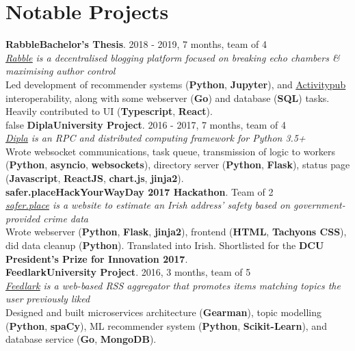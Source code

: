 \documentclass[a4paper, oneside, final]{scrartcl}
\newcommand{\nasc}[2]{\href{#1}{\color{blue}\setulcolor{blue}\ul{#2}}}
\newcommand{\bearna}[0]{\vspace{2.25mm}\\}
\newcommand{\fmtjobtitle}[1]{\textbf{#1}}
\newcommand{\fmtblurb}[1]{\textit{#1}}
\newcommand{\fmtskill}[1]{\textbf{#1}}
\begin{document}
\section{Notable Projects}
\fmtjobtitle{Rabble\hfill Bachelor's Thesis}. 2018 - 2019, 7 months, team of 4\\
\fmtblurb{\nasc{https://github.com/cpssd/rabble}{Rabble} is a decentralised blogging platform focused on breaking echo chambers \& maximising author control}\\
Led development of recommender systems (\fmtskill{Python}, \fmtskill{Jupyter}), and \nasc{http://activitypub.rocks}{Activitypub} interoperability, along with some webserver (\fmtskill{Go}) and database (\fmtskill{SQL}) tasks. Heavily contributed to UI (\fmtskill{Typescript}, \fmtskill{React}).
\bearna
\if false
\fmtjobtitle{Dipla\hfill University Project}. 2016 - 2017, 7 months, team of 4\\
\fmtblurb{\nasc{https://cpssd.net/project/dipla/}{Dipla} is an RPC and distributed computing framework for Python 3.5+}\\
Wrote websocket communications, task queue, transmission of logic to workers (\fmtskill{Python}, \fmtskill{asyncio}, \fmtskill{websockets}), directory server (\fmtskill{Python}, \fmtskill{Flask}), status page (\fmtskill{Javascript}, \fmtskill{ReactJS}, \fmtskill{chart.js}, \fmtskill{jinja2}).
\bearna
\fmtjobtitle{safer.place\hfill HackYourWayDay 2017 Hackathon}. Team of 2\\
\fmtblurb{\nasc{http://safer.place}{safer.place} is a website to estimate an Irish address’ safety based on government-provided crime data}\\
Wrote webserver (\fmtskill{Python}, \fmtskill{Flask}, \fmtskill{jinja2}), frontend (\fmtskill{HTML}, \fmtskill{Tachyons CSS}), did data cleanup (\fmtskill{Python}). Translated into Irish. Shortlisted for the \fmtskill{DCU President’s Prize for Innovation 2017}.
\bearna
\fi
\fmtjobtitle{Feedlark\hfill University Project}. 2016, 3 months, team of 5\\
\fmtblurb{\nasc{https://cpssd.net/project/feedlark/}{Feedlark} is a web-based RSS aggregator that promotes items matching topics the user previously liked}\\
Designed and built microservices architecture (\fmtskill{Gearman}), topic modelling (\fmtskill{Python}, \fmtskill{spaCy}), ML recommender system
(\fmtskill{Python}, \fmtskill{Scikit-Learn}), and database service (\fmtskill{Go}, \fmtskill{MongoDB}).
\end{document}

